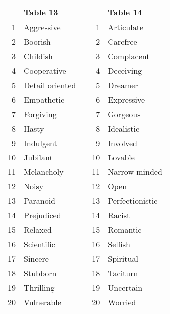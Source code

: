 \documentclass[12pt]{article}
\begin{document}
\begin{tabular}{r|l l r|l}
 & Table 13 & & & Table 14 \\\hline
 1 & Aggressive & &  1 & Articulate\\
 2 & Boorish & &  2 & Carefree\\
 3 & Childish & &  3 & Complacent\\
 4 & Cooperative & &  4 & Deceiving\\
 5 & Detail oriented & &  5 & Dreamer\\
 6 & Empathetic & &  6 & Expressive\\
 7 & Forgiving & &  7 & Gorgeous\\
 8 & Hasty & &  8 & Idealistic\\
 9 & Indulgent & &  9 & Involved\\
10 & Jubilant & & 10 & Lovable\\
11 & Melancholy & & 11 & Narrow-minded\\
12 & Noisy & & 12 & Open\\
13 & Paranoid & & 13 & Perfectionistic\\
14 & Prejudiced & & 14 & Racist\\
15 & Relaxed & & 15 & Romantic\\
16 & Scientific & & 16 & Selfish\\
17 & Sincere & & 17 & Spiritual\\
18 & Stubborn & & 18 & Taciturn\\
19 & Thrilling & & 19 & Uncertain\\
20 & Vulnerable & & 20 & Worried\\
\end{tabular}
\end{document}
